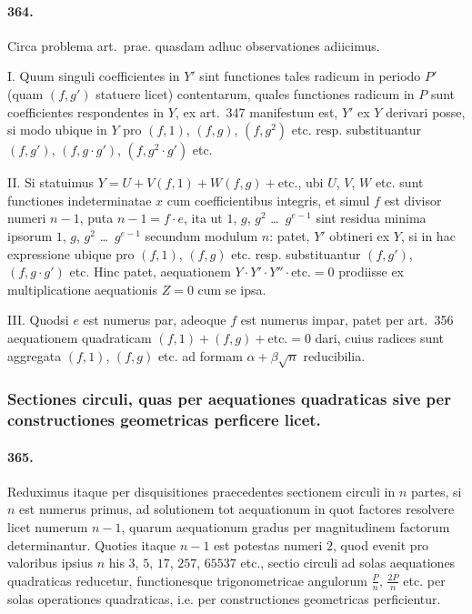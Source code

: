 \documentclass[12pt,a4paper]{article}
\theoremstyle{plain}
\theoremstyle{definition}
\theoremstyle{remark}
\begin{document}
\paragraph{364.}
Circa problema art.~prae. quasdam adhuc observationes adiicimus.

I. Quum singuli coefficientes in $Y'$ sint functiones tales radicum in
periodo $P'$ (quam $(f,g')$ statuere licet) contentarum, quales functiones
radicum in $P$ sunt coefficientes respondentes in $Y$, ex art.~347
manifestum est, $Y'$ ex $Y$ derivari posse, si modo ubique in $Y$ pro
$(f,1)$, $(f,g)$, $(f,g^2)$ etc. resp. substituantur $(f,g')$,
$(f,g \cdot g')$, $(f,g^2 \cdot g')$ etc.

II. Si statuimus $Y = U + V(f,1) + W(f,g) + \text{etc.}$, ubi $U$, $V$,
$W$ etc. sunt functiones indeterminatae $x$ cum coefficientibus integris,
et simul $f$ est divisor numeri $n-1$, puta $n-1 = f \cdot e$, ita ut
$1$, $g$, $g^2$ \ldots\ $g^{e-1}$ sint residua minima ipsorum
$1$, $g$, $g^2$ \ldots\ $g^{e-1}$ secundum modulum $n$: patet, $Y'$ obtineri
ex $Y$, si in hac expressione ubique pro $(f,1)$, $(f,g)$ etc. resp.
substituantur $(f,g')$, $(f,g \cdot g')$ etc. Hinc patet, aequationem
$Y \cdot Y' \cdot Y'' \cdot \text{etc.} = 0$ prodiisse ex multiplicatione
aequationis $Z = 0$ cum se ipsa.

III. Quodsi $e$ est numerus par, adeoque $f$ est numerus impar, patet
per art.~356 aequationem quadraticam $(f,1) + (f,g) + \text{etc.} = 0$
dari, cuius radices sunt aggregata $(f,1)$, $(f,g)$ etc. ad formam
$\alpha + \beta\sqrt{n}$ reducibilia.

\subsubsection*{Sectiones circuli, quas per aequationes quadraticas sive per constructiones geometricas perficere licet.}

\paragraph{365.}
Reduximus itaque per disquisitiones praecedentes sectionem circuli in $n$
partes, si $n$ est numerus primus, ad solutionem tot aequationum in quot
factores resolvere licet numerum $n-1$, quarum aequationum gradus per
magnitudinem factorum determinantur. Quoties itaque $n-1$ est potestas
numeri $2$, quod evenit pro valoribus ipsius $n$ his $3$, $5$, $17$, $257$,
$65537$ etc., sectio circuli ad solas aequationes quadraticas reducetur,
functionesque trigonometricae angulorum $\frac{P}{n}$, $\frac{2P}{n}$ etc.
per solas operationes quadraticas, i.e. per constructiones geometricas
perficientur.
\end{document}
